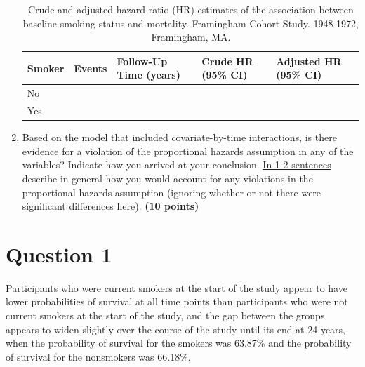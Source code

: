 \documentclass{article}\usepackage[]{graphicx}\usepackage[]{color}
\newif\ifdraft  %
\begin{document}
\begin{enumerate}
\begin{table}[H]
\centering
\parbox{10cm}{\caption{Crude and adjusted hazard ratio (HR) estimates of the association between baseline smoking status and mortality. Framingham Cohort Study. 1948-1972, Framingham, MA.}} 
\begin{tabular}{lllll}
  \hline
Smoker & Events & Follow-Up Time (years) & Crude HR (95\% CI) & Adjusted HR (95\% CI) \\ 
  \hline
No &  &  &  &  \\ 
  Yes &  &  &  &  \\ 
   \hline
\end{tabular}
\end{table}

  
  \item Based on the model that included covariate-by-time interactions, is there evidence for a violation of the proportional hazards assumption in any of the variables? Indicate how you arrived at your conclusion. \ul{In 1-2 sentences} describe in general how you would account for any violations in the proportional hazards assumption (ignoring whether or not there were significant differences here). \textbf{(10 points)}
\end{enumerate}

\pagebreak

\section*{Question 1}

\ifdraft

Using the Kaplan-Meier plots, graphically assess the relationship between baseline smoking status and time to death. \textbf{Briefly interpret what you see.} In 1-2 sentences describe the limitations of this approach. [{\ul{include the graph}}, labeled \textbf{Figure 1}] \textbf{(10 points)}

\fi



Participants who were current smokers at the start of the study appear to have lower probabilities of survival at all time points than participants who were not current smokers at the start of the study, and the gap between the groups appears to widen slightly over the course of the study until its end at 24 years, when the probability of survival for the smokers was 63.87\% and the probability of survival for the nonsmokers was 66.18\%.
\end{document}
